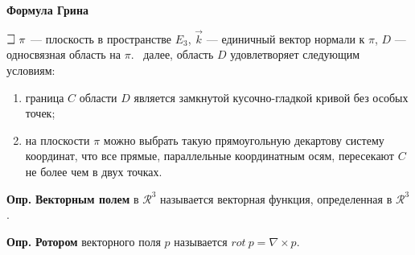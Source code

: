 
\begin{center}
    \textbf{Формула Грина}
\end{center}

$\mathLet ~ \pi$ --- плоскость в пространстве $E_3$, $\overrightarrow{k}$ --- единичный вектор нормали к $\pi$, $D$ --- односвязная область на $\pi$. \mathLet \ далее, область $D$ удовлетворяет следующим условиям:
\begin{enumerate}
    \item граница $C$ области $D$ является замкнутой кусочно-гладкой кривой без особых точек;
    \item на плоскости $\pi$ можно выбрать такую прямоугольную декартову систему координат, что все прямые, параллельные координатным осям, пересекают $C$ не более чем в двух точках.
\end{enumerate}


\textbf{Опр.} \textbf{Векторным полем} в $\mathcal{R}^3$ называется векторная функция, определенная в $\mathcal{R}^3$.

\textbf{Опр.} \textbf{Ротором} векторного поля $p$ называется $rot~p = \nabla \times p$. 


